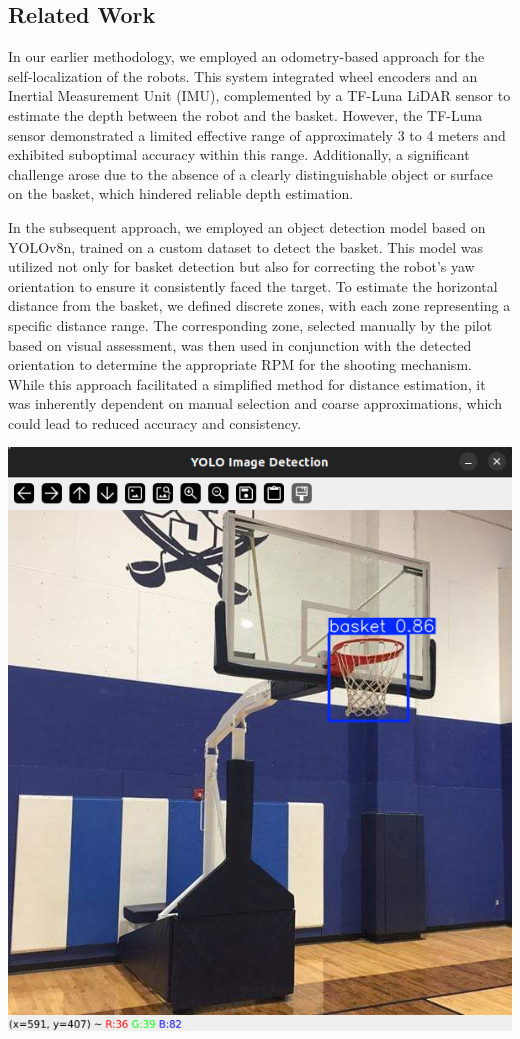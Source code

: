 \documentclass[a4paper]{article}
\begin{document}
\begin{multicols}{2}
\section{Related Work}
In our earlier methodology, we employed an odometry-based approach for the self-localization of the robots. This system integrated wheel encoders and an Inertial Measurement Unit (IMU), complemented by a TF-Luna LiDAR sensor to estimate the depth between the robot and the basket. However, the TF-Luna sensor demonstrated a limited effective range of approximately 3 to 4 meters and exhibited suboptimal accuracy within this range. Additionally, a significant challenge arose due to the absence of a clearly distinguishable object or surface on the basket, which hindered reliable depth estimation.
\par \noindent
In the subsequent approach, we employed an object detection model based on YOLOv8n, trained on a custom dataset to detect the basket. This model was utilized not only for basket detection but also for correcting the robot’s yaw orientation to ensure it consistently faced the target. To estimate the horizontal distance from the basket, we defined discrete zones, with each zone representing a specific distance range. The corresponding zone, selected manually by the pilot based on visual assessment, was then used in conjunction with the detected orientation to determine the appropriate RPM for the shooting mechanism. While this approach facilitated a simplified method for distance estimation, it was inherently dependent on manual selection and coarse approximations, which could lead to reduced accuracy and consistency.

{ \centering
  \includegraphics[scale=0.3]{results/yolo_detection.png}\\
  \label{fig:basket_detection}
}


\end{multicols}
\end{document}
